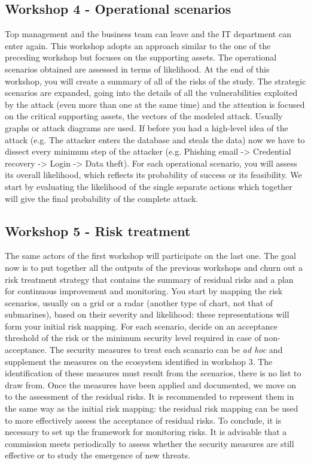\subsection{Workshop 4 - Operational scenarios}
Top management and the business team can leave and the IT department can enter again. This workshop adopts an approach similar to the one of the preceding workshop but focuses on the supporting assets. The operational scenarios obtained are assessed in terms of likelihood. At the end of this workshop, you will create a summary of all of the risks of the study. The strategic scenarios are expanded, going into the details of all the vulnerabilities exploited by the attack (even more than one at the same time) and the attention is focused on the critical supporting assets, the vectors of the modeled attack. Usually graphs or attack diagrams are used. If before you had a high-level idea of the attack (e.g. The attacker enters the database and steals the data) now we have to dissect every minimum step of the attacker (e.g. Phishing email -> Credential recovery -> Login -> Data theft). For each operational scenario, you will assess its overall likelihood, which reflects its probability of success or its feasibility. We start by evaluating the likelihood of the single separate actions which together will give the final probability of the complete attack.
\subsection{Workshop 5 - Risk treatment}
The same actors of the first workshop will participate on the last one. The goal now is to put together all the outputs of the previous workshops and churn out a risk treatment strategy that contains the summary of residual risks and a plan for continuous improvement and monitoring. You start by mapping the risk scenarios, usually on a grid or a radar (another type of chart, not that of submarines), based on their severity and likelihood: these representations will form your initial risk mapping. For each scenario, decide on an acceptance threshold of the risk or the minimum security level required in case of non-acceptance. The security measures to treat each scanario can be \textit{ad hoc} and supplement the measures on the ecosystem identified in workshop 3. The identification of these measures must result from the scenarios, there is no list to draw from. Once the measures have been applied and documented, we move on to the assessment of the residual risks. It is recommended to represent them in the same way as the initial risk mapping: the residual risk mapping can be used to more effectively assess the acceptance of residual risks. To conclude, it is necessary to set up the framework for monitoring risks. It is advisable that a commission meets periodically to assess whether the security measures are still effective or to study the emergence of new threats.
